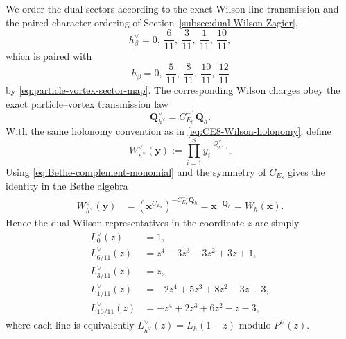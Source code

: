 \documentclass[11pt,a4paper]{article}
\numberwithin{equation}{section}
\begin{document}
We order the dual sectors according to the exact Wilson line transmission and the paired character ordering of Section~\ref{subsec:dual-Wilson-Zagier},
\begin{equation}
  h_\beta^\vee
  =0,\ \frac6{11},\ \frac3{11},\ \frac1{11},\ \frac{10}{11},
  \label{eq:CE8inv-sector-order}
\end{equation}
which is paired with
\begin{equation}
  h_\beta
  =0,\ \frac5{11},\ \frac8{11},\ \frac{10}{11},\ \frac{12}{11}
\end{equation}
by \eqref{eq:particle-vortex-sector-map}.  The corresponding Wilson charges obey the exact particle--vortex transmission law
\begin{equation}
  \boldsymbol Q_{h^\vee}^\vee
  =C_{E_8}^{-1}\boldsymbol Q_h.
  \label{eq:CE8inv-Wilson-charge-map-TQFT}
\end{equation}
With the same holonomy convention as in \eqref{eq:CE8-Wilson-holonomy}, define
\begin{equation}
  W_{h^\vee}^\vee(\boldsymbol y)
  :=\prod_{i=1}^{8}y_i^{-Q_{h^\vee,i}^\vee}.
  \label{eq:CE8inv-Wilson-holonomy}
\end{equation}
Using \eqref{eq:Bethe-complement-monomial} and the symmetry of $C_{E_8}$ gives the identity in the Bethe algebra
\begin{equation}
\begin{aligned}
  W_{h^\vee}^\vee(\boldsymbol y)
  &=(\boldsymbol x^{C_{E_8}})^{-C_{E_8}^{-1}\boldsymbol Q_h}
  =\boldsymbol x^{-\boldsymbol Q_h}
  =W_h(\boldsymbol x).
\end{aligned}
  \label{eq:Wilson-eigenvalue-complement}
\end{equation}
Hence the dual Wilson representatives in the coordinate $z$ are simply
\begin{equation}
\begin{aligned}
  L_0^\vee(z)&=1,\\
  L_{6/11}^\vee(z)&=z^4-3z^3-3z^2+3z+1,\\
  L_{3/11}^\vee(z)&=z,\\
  L_{1/11}^\vee(z)&=-2z^4+5z^3+8z^2-3z-3,\\
  L_{10/11}^\vee(z)&=-z^4+2z^3+6z^2-z-3,
\end{aligned}
  \label{eq:CE8inv-Wilson-polynomials}
\end{equation}
where each line is equivalently $L_{h^\vee}^\vee(z)=L_h(1-z)$ modulo $P^\vee(z)$.
\end{document}
